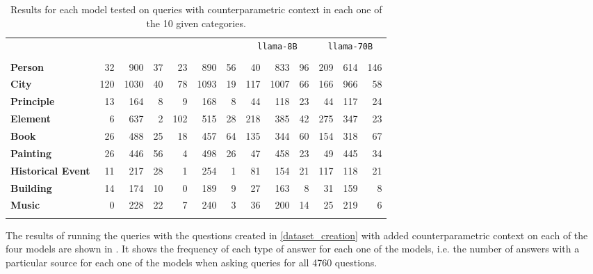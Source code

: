 \begin{table*}[t]
	\centering
	\footnotesize
	\begin{tabular}{>{\bfseries}l | r r r | r r r | r r r | r r r}
		\toprule
			& \multicolumn{3}{c|}{\smallflan{}} & \multicolumn{3}{c|}{\bigflan{}} & \multicolumn{3}{c|}{\texttt{llama-8B}} & \multicolumn{3}{c}{\texttt{llama-70B}}  \\
			& \Pc{} & \Cc{} & \Oc{} & \Pc{} & \Cc{} & \Oc{} & \Pc{} & \Cc{} & \Oc{} & \Pc{} & \Cc{} & \Oc{}  \\
		\midrule
			Person           &  32 &  900 & 37 &  23 &  890 & 56 &  40 &  833 & 96 & 209 & 614 & 146 \\
			City             & 120 & 1030 & 40 &  78 & 1093 & 19 & 117 & 1007 & 66 & 166 & 966 &  58 \\
			Principle        &  13 &  164 &  8 &   9 &  168 &  8 &  44 &  118 & 23 &  44 & 117 &  24 \\
			Element          &   6 &  637 &  2 & 102 &  515 & 28 & 218 &  385 & 42 & 275 & 347 &  23 \\
			Book             &  26 &  488 & 25 &  18 &  457 & 64 & 135 &  344 & 60 & 154 & 318 &  67 \\
			Painting         &  26 &  446 & 56 &   4 &  498 & 26 &  47 &  458 & 23 &  49 & 445 &  34 \\
			Historical Event &  11 &  217 & 28 &   1 &  254 &  1 &  81 &  154 & 21 & 117 & 118 &  21 \\
			Building         &  14 &  174 & 10 &   0 &  189 &  9 &  27 &  163 &  8 &  31 & 159 &   8 \\
			Music      &   0 &  228 & 22 &   7 &  240 &  3 &  36 &  200 & 14 &  25 & 219 &   6 \\
		\bottomrule \addlinespace[4pt]
	\end{tabular}
	\caption{Results for each model tested on queries with counterparametric context in each one of the 10 given categories.}
	\label{cats_table}
\end{table*}

The results of running the queries with the questions created in \cref{dataset_creation} with added counterparametric context on each of the four models are shown in 
. 
It shows the frequency of each type of answer for each one of the models,
i.e. the number of answers with a particular source for each one of the models when asking queries for all 4760 questions.



